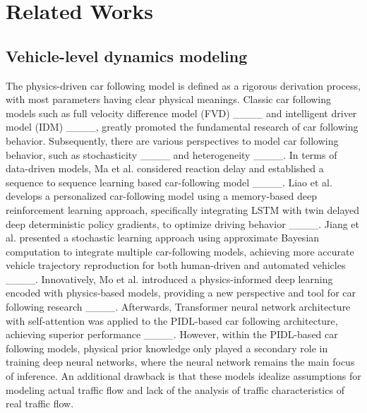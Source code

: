 \section{Related Works\label{2}
}
\subsection{Vehicle-level dynamics modeling}
The physics-driven car following model is defined as a rigorous derivation process, with most parameters having clear physical meanings. Classic car following models such as full velocity difference model (FVD) ____ and intelligent driver model (IDM) ____, greatly promoted the fundamental research of car following behavior. Subsequently, there are various perspectives to model car following behavior, such as stochasticity ____ and heterogeneity ____. 
In terms of data-driven models, Ma et al. considered reaction delay and established a sequence to sequence learning based car-following model ____. Liao et al. develops a personalized car-following model using a memory-based deep reinforcement learning approach, specifically integrating LSTM with twin delayed deep deterministic policy gradients, to optimize driving behavior ____. Jiang et al. presented a stochastic learning approach using approximate Bayesian computation to integrate multiple car-following models, achieving more accurate vehicle trajectory reproduction for both human-driven and automated vehicles ____. 
Innovatively, Mo et al. introduced a physics-informed deep learning encoded with physics-based models, providing a new perspective and tool for car following research ____. Afterwards, Transformer neural network architecture with self-attention was applied to the PIDL-based car following architecture, achieving superior performance ____. However, within the PIDL-based car following models, physical prior knowledge only played a secondary role in training deep neural networks, where the neural network remains the main focus of inference. An additional drawback is that these models idealize assumptions for modeling actual traffic flow and lack of the analysis of traffic characteristics of real traffic flow.

